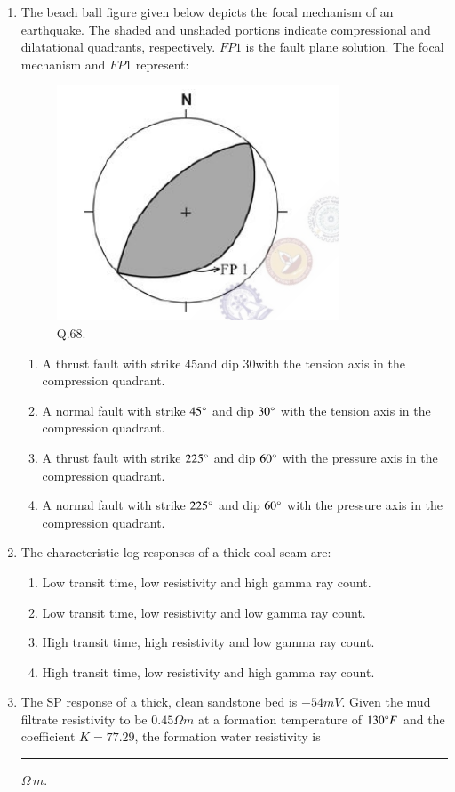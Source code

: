 \documentclass[journal,12pt,onecolumn]{IEEEtran}
\theoremstyle{remark}
\begin{document}
\begin{enumerate}
    \item The beach ball figure given below depicts the focal mechanism of an earthquake. The shaded and unshaded portions indicate compressional and dilatational quadrants, respectively. $FP1$ is the fault plane solution. The focal mechanism and $FP1$ represent: \hfill{}
        \begin{figure}[H]
            \centering
            \includegraphics[width=0.5\columnwidth]{Figs/fig_11.png}
            \caption{Q.68.}
            \label{fig:placeholder_}
        \end{figure}
                \begin{enumerate}
                        \item A thrust fault with strike 45\degree and dip 30\degree with the tension axis in the compression quadrant.
                        \item A normal fault with strike $45\degree$ and dip $30\degree$ with the tension axis in the compression quadrant.
                        \item A thrust fault with strike $225\degree$ and dip $60\degree$ with the pressure axis in the compression quadrant.
                        \item A normal fault with strike $225\degree$ and dip $60\degree$ with the pressure axis in the compression quadrant.
                \end{enumerate}
     \item The characteristic log responses of a thick coal seam are: \hfill{}
                \begin{enumerate}
                        \item Low transit time, low resistivity and high gamma ray count.
                        \item Low transit time, low resistivity and low gamma ray count.
                        \item High transit time, high resistivity and low gamma ray count.
                        \item High transit time, low resistivity and high gamma ray count.
                \end{enumerate}
    \item The SP response of a thick, clean sandstone bed is $-54 mV$. Given the mud filtrate resistivity to be $0.45\Omega m$  at a formation temperature of $130\degree F$ and the coefficient $K = 77.29$, the formation water resistivity is \rule{3cm}{0.15mm} $\Omega\,m$. \hfill{}
    

\end{enumerate}
\end{document}
